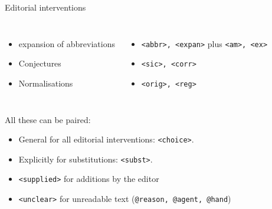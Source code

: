 \begin{frame}[fragile]{Editorial interventions}

\begin{columns}
\begin{itemize}
    \item expansion of abbreviations
    \item Conjectures
    \item Normalisations
\end{itemize}
\begin{itemize}
\item \texttt{<abbr>, <expan>} plus \texttt{<am>, <ex>}
\item \texttt{<sic>, <corr>}
\item \texttt{<orig>, <reg>}
\end{itemize}
\end{columns}\bigskip

\begin{block}{All these can be paired:}
\begin{itemize}
    \item General for all editorial interventions: \texttt{<choice>}.
    \item Explicitly for substitutions: \texttt{<subst>}.
    \item \texttt{<supplied>} for additions by the editor
    \item \texttt{<unclear>} for unreadable text (\texttt{@reason, @agent, @hand})
\end{itemize}
\end{block}

\end{frame}
